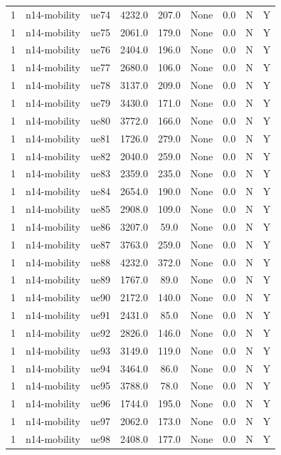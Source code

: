 \begin{table}[ht]
\begin{tabular}{|c|c|c|c|c|c|c|c|c|}
1 & n14-mobility & ue74 & 4232.0 & 207.0 & None & 0.0 & N & Y \\
1 & n14-mobility & ue75 & 2061.0 & 179.0 & None & 0.0 & N & Y \\
1 & n14-mobility & ue76 & 2404.0 & 196.0 & None & 0.0 & N & Y \\
1 & n14-mobility & ue77 & 2680.0 & 106.0 & None & 0.0 & N & Y \\
1 & n14-mobility & ue78 & 3137.0 & 209.0 & None & 0.0 & N & Y \\
1 & n14-mobility & ue79 & 3430.0 & 171.0 & None & 0.0 & N & Y \\
1 & n14-mobility & ue80 & 3772.0 & 166.0 & None & 0.0 & N & Y \\
1 & n14-mobility & ue81 & 1726.0 & 279.0 & None & 0.0 & N & Y \\
1 & n14-mobility & ue82 & 2040.0 & 259.0 & None & 0.0 & N & Y \\
1 & n14-mobility & ue83 & 2359.0 & 235.0 & None & 0.0 & N & Y \\
1 & n14-mobility & ue84 & 2654.0 & 190.0 & None & 0.0 & N & Y \\
1 & n14-mobility & ue85 & 2908.0 & 109.0 & None & 0.0 & N & Y \\
1 & n14-mobility & ue86 & 3207.0 & 59.0 & None & 0.0 & N & Y \\
1 & n14-mobility & ue87 & 3763.0 & 259.0 & None & 0.0 & N & Y \\
1 & n14-mobility & ue88 & 4232.0 & 372.0 & None & 0.0 & N & Y \\
1 & n14-mobility & ue89 & 1767.0 & 89.0 & None & 0.0 & N & Y \\
1 & n14-mobility & ue90 & 2172.0 & 140.0 & None & 0.0 & N & Y \\
1 & n14-mobility & ue91 & 2431.0 & 85.0 & None & 0.0 & N & Y \\
1 & n14-mobility & ue92 & 2826.0 & 146.0 & None & 0.0 & N & Y \\
1 & n14-mobility & ue93 & 3149.0 & 119.0 & None & 0.0 & N & Y \\
1 & n14-mobility & ue94 & 3464.0 & 86.0 & None & 0.0 & N & Y \\
1 & n14-mobility & ue95 & 3788.0 & 78.0 & None & 0.0 & N & Y \\
1 & n14-mobility & ue96 & 1744.0 & 195.0 & None & 0.0 & N & Y \\
1 & n14-mobility & ue97 & 2062.0 & 173.0 & None & 0.0 & N & Y \\
1 & n14-mobility & ue98 & 2408.0 & 177.0 & None & 0.0 & N & Y \\

\end{tabular}
\end{table}
